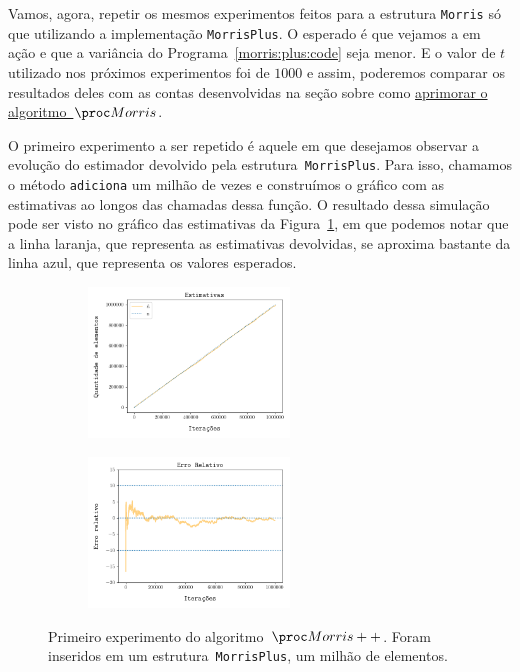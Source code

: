 Vamos, agora, repetir os mesmos experimentos feitos para a estrutura \texttt{Morris} só que utilizando a implementação 
\texttt{MorrisPlus}. O esperado é que vejamos a  em ação e que a variância do 
Programa~\ref{morris:plus:code} seja menor. E o valor de $t$ utilizado nos próximos experimentos foi de $1000$ e assim, 
poderemos comparar os resultados deles com as contas desenvolvidas na seção sobre como 
\hyperref[sec:morris:plus]{aprimorar o algoritmo~$\Morris$}.

O primeiro experimento a ser repetido é aquele em que desejamos observar a evolução do estimador devolvido pela 
estrutura~\texttt{MorrisPlus}. Para isso, chamamos o método \texttt{adiciona} um milhão de vezes e construímos o 
gráfico com as estimativas ao longos das chamadas dessa função. O resultado dessa simulação pode ser visto no gráfico 
das estimativas da Figura~\ref{fig:morris:plus:full}, em que podemos notar que a linha laranja, que representa as 
estimativas devolvidas, se aproxima bastante da linha azul, que representa os valores esperados.

\begin{figure}
  \centering
  \begin{subfigure}{.5\textwidth}
    \centering
    \includegraphics[height=4cm, width=\linewidth]{figuras/morris_plus_full.png}
  \end{subfigure}%
  \begin{subfigure}{.5\textwidth}
    \centering
    \captionsetup{justification=centering}
    \includegraphics[width=\linewidth, height=4cm]{figuras/morris_plus_erro_full.png}
  \end{subfigure}
  \caption{Primeiro experimento do algoritmo~$\Morrispp$. Foram inseridos em um estrutura~\texttt{MorrisPlus}, um milhão
  de elementos.}
  \label{fig:morris:plus:full}
\end{figure}

